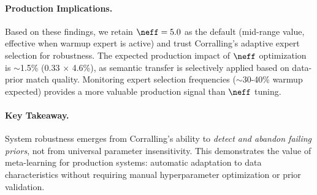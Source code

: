 \paragraph{Production Implications.}
Based on these findings, we retain $\neff=5.0$ as the default (mid-range value, effective when warmup expert is active) and trust Corralling's adaptive expert selection for robustness. The expected production impact of $\neff$ optimization is $\sim$1.5\% (0.33 $\times$ 4.6\%), as semantic transfer is selectively applied based on data-prior match quality. Monitoring expert selection frequencies ($\sim$30-40\% warmup expected) provides a more valuable production signal than $\neff$ tuning.

\paragraph{Key Takeaway.}
System robustness emerges from Corralling's ability to \textit{detect and abandon failing priors}, not from universal parameter insensitivity. This demonstrates the value of meta-learning for production systems: automatic adaptation to data characteristics without requiring manual hyperparameter optimization or prior validation.
